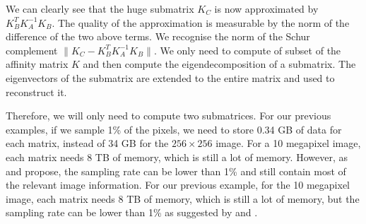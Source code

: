  We can clearly see that the huge submatrix \(K_C\) is now approximated by \(K_B^T K_A^{-1} K_B\).
 The quality of the approximation is measurable by the norm of the difference of the two above terms.
 We recognise the norm of the Schur complement \(\| K_C - K_B^T K_A^{-1} K_B \| \).
\else
 We only need to compute of subset of the affinity matrix \(K\) and then compute the eigendecomposition of a submatrix.
 The eigenvectors of the submatrix are extended to the entire matrix and used to reconstruct it.
\fi

Therefore, we will only need to compute two submatrices.
\ifthesis
 For our previous examples, if we sample 1\% of the pixels, we need to store 0.34 GB of data for each matrix, instead of 34 GB for the \(256 \times 256\) image.
 For a 10 megapixel image, each matrix needs 8 TB of memory, which is still a lot of memory.
 However, as \cite{fowlkes_spectral_2004} and \cite{glide_2014} propose, the sampling rate can be lower than 1\% and still contain most of the relevant image information.
\else
 For our previous example, for the 10 megapixel image, each matrix needs 8 TB of memory, which is still a lot of memory, but the sampling rate can be lower than 1\% as suggested by \cite{fowlkes_spectral_2004} and \cite{glide_2014}.
\fi
